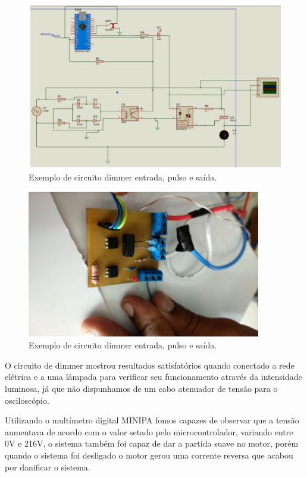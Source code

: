  		\begin{figure}[H]
 			\begin{center}
 				\includegraphics[scale = 1]{figuras/Circuito_Dimmer}
 				\caption{Exemplo de circuito dimmer entrada, pulso e saída.}
 			\end{center}
 		\end{figure}
 		
 		 		\begin{figure}[H]
 		 			\begin{center}
 		 				\includegraphics[scale = 1]{figuras/PCB_DImmer}
 		 				\caption{Exemplo de circuito dimmer entrada, pulso e saída.}
 		 			\end{center}
 		 		\end{figure}
 		 		
 O circuito de dimmer mostrou resultados satisfatórios quando conectado a rede elétrica e a uma lâmpada para verificar seu funcionamento através da intensidade luminosa, já que não dispunhamos de um cabo atenuador de tensão para o osciloscópio.
 
 Utilizando o multímetro digital MINIPA fomos capazes de observar que a tensão aumentava de acordo com o valor setado pelo microcontrolador, variando entre 0V e 216V, o sistema também foi capaz de dar a partida suave no motor, porém quando o sistema foi desligado o motor gerou uma corrente reversa que acabou por danificar o sistema.
 
